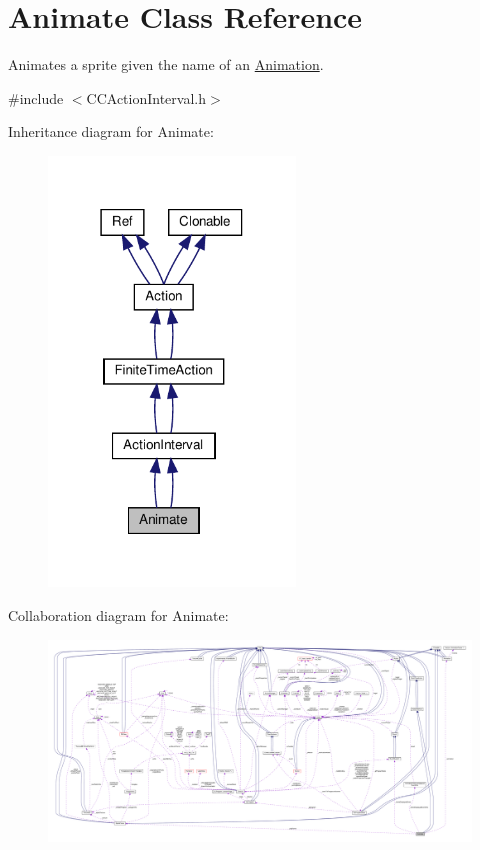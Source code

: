 \hypertarget{classAnimate}{}\section{Animate Class Reference}
\label{classAnimate}


Animates a sprite given the name of an \hyperlink{classAnimation}{Animation}.  




{\ttfamily \#include $<$C\+C\+Action\+Interval.\+h$>$}



Inheritance diagram for Animate\+:
\nopagebreak
\begin{figure}[H]
\begin{center}
\leavevmode
\includegraphics[width=186pt]{classAnimate__inherit__graph}
\end{center}
\end{figure}


Collaboration diagram for Animate\+:
\nopagebreak
\begin{figure}[H]
\begin{center}
\leavevmode
\includegraphics[width=350pt]{classAnimate__coll__graph}
\end{center}
\end{figure}
